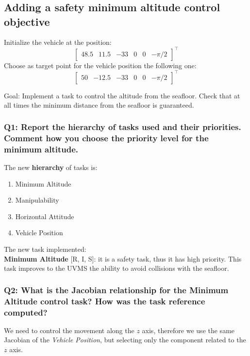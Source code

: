 \documentclass{article}
\begin{document}
\subsection{Adding a safety minimum altitude control objective}
Initialize the vehicle at the position:
\begin{displaymath}
\begin{bmatrix} 48.5 & 11.5 & -33 & 0 & 0 &-\pi/2\end{bmatrix}^\top
\end{displaymath} 
Choose as target point for the vehicle position the following one:
\begin{displaymath}
\begin{bmatrix} 50 & -12.5 & -33 & 0 & 0 &-\pi/2 \end{bmatrix}^\top
\end{displaymath}

Goal: Implement a task to control the altitude from the seafloor. Check that at all times the minimum distance from the seafloor is guaranteed.

\subsubsection{Q1: Report the hierarchy of tasks used and their priorities. Comment how you choose the priority level for the minimum altitude.}

\noindent
\vspace{5px}
The new \textbf{hierarchy} of tasks is:
\begin{enumerate}
 \item Minimum Altitude
 \item Manipulability
 \item Horizontal Attitude
 \item Vehicle Position
\end{enumerate}

\noindent
\vspace{5px}
The new task implemented: \\
\textbf{Minimum Altitude} [R, I, S]: it is a safety task, thus it has high priority. This task improves to the UVMS the ability to avoid collisions with the seafloor.

\subsubsection{Q2: What is the Jacobian relationship for the Minimum Altitude control task? How was the task reference computed?}
We need to control the movement along the $z$ axis, therefore we use the same Jacobian of the \textit{Vehicle Position}, but selecting only the component related to the $z$ axis.
\end{document}
